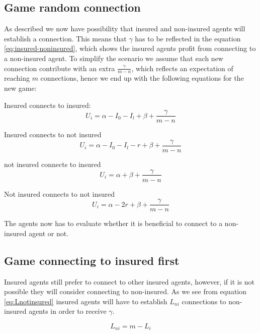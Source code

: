 \subsection{Game random connection}
As described we now have possibility that insured and non-insured agents will establish a connection. This means that $\gamma$ has to be reflected in the equation \ref{eq:insured-noninsured}, which shows the insured agents profit from connecting to a non-insured agent. To simplify the scenario we assume that each new connection contribute with an extra $\frac{\gamma}{ m-n}$, which reflects an expectation of reaching $m$ connections, hence we end up with the following equations for the new game:

Insured connects to insured:
\begin{equation}
U_{i}=\alpha - I_{0} - I_{l} + \beta + \frac{\gamma}{ m-n}
\label{eq:insured-noninsured}
\end{equation}

Insured connects to not insured
\begin{equation}
U_{i}=\alpha - I_{0} - I_{l} - r + \beta + \frac{\gamma}{ m-n}
\label{eq:insured-noninsured}
\end{equation}

not insured connects to insured
\begin{equation}
U_{i}=\alpha  + \beta + \frac{\gamma}{ m-n}
\label{eq:insured-noninsured}
\end{equation}

Not insured connects to not insured
\begin{equation}
U_{i}=\alpha - 2r + \beta + \frac{\gamma}{ m-n}
\label{eq:insured-noninsured}
\end{equation}



The agents now has to evaluate whether it is beneficial to connect to a non-insured agent or not.


\subsection{Game connecting to insured first}
Insured agents still prefer to connect to other insured agents, however, if it is not possible they will consider connecting to non-insured. As we see from equation \ref{eq:Lnotinsured} insured agents will have to establish $L_{ni}$ connections to non-insured agents in order to receive $\gamma$. 

\begin{equation} 
L_{ni} = m - L_{i} 
\label{eq:Lnotinsured}
\end{equation}



